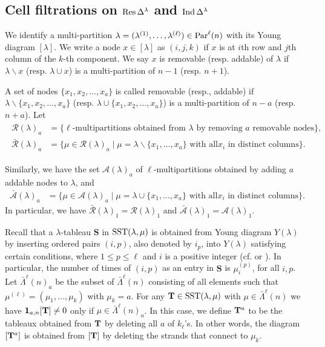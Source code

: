 \subsection{Cell filtrations on $\operatorname{Res}\nolimits \Delta^\lambda$ and $\operatorname{Ind}\nolimits \Delta^\lambda$}

We identify a multi-partition $\lambda=(\lambda^{(1)}, \ldots, \lambda^{(\ell)})\in \text{Par}^\ell(n)$ with its Young diagram $[\lambda]$. We write a node $x\in [\lambda]$ as $ (i,j,k)$ if $x$ is at $i$th row and $j$th column of the $k$-th component. We say $x$ is  removable (resp. addable) of $\lambda$ if $\lambda\backslash x$ (resp. $\lambda\cup x$) is a multi-partition of $n-1$ (resp. $n+1$). 

A set of nodes $\{x_1,x_2,\ldots,x_a\}$ is called removable (resp., addable) if $\lambda\backslash \{x_1,x_2,\ldots,x_a\}$ (resp. $\lambda\cup \{x_1,x_2,\ldots,x_a\}$) is a multi-partition of $n-a$ (resp. $n+a$). Let
\begin{align}
\begin{split}
    \mathcal R(\lambda)_a &=\{ \text{$\ell$-multipartitions  obtained from $\lambda$ by removing $a$ removable nodes}\},
    \\
    \bar {\mathcal R}(\lambda)_a &=\{\mu \in \mathcal R(\lambda)_a\mid \mu =\lambda\backslash \{x_1, \ldots,x_a\} \text{ with all
$x_i$ in distinct columns}\}.
\end{split}
\end{align}

Similarly, we have the set $\mathcal A(\lambda)_a$ of $\ell$-multipartitions obtained by adding $a$ addable nodes to $\lambda$, and 
\begin{align}
    \bar {\mathcal A}(\lambda)_a &=\{\mu \in \mathcal A(\lambda)_a\mid \mu =\lambda\cup \{x_1, \ldots,x_a\} \text{ with all
$x_i$ in distinct columns}\}.
\end{align}
In particular, we have $\bar {\mathcal R}(\lambda)_1=  \mathcal R(\lambda)_1$
and $\bar {\mathcal A}(\lambda)_1=  \mathcal A(\lambda)_1$.

Recall that a   $\lambda$-tableau $\mathbf S$ in $\text{SST}(\lambda, \mu)$ is obtained from Young diagram $Y(\lambda)$ by inserting ordered pairs $(i,p)$, also denoted by $i_p$, into $Y(\lambda)$ satisfying certain conditions,  where $1\le p\le \ell$ and $i$ is a positive integer (cf. \cite[Definition (4.4)]{DJM98} or \cite[Ex. 4.2]{SW24Schur}). In particular, the number of times of $(i,p)$ as an entry in $\mathbf S$ is $\mu^{(p)}_i$, for all $i,p$. Let $\bar \Lambda^\ell(n)_a$ be the subset of $\bar\Lambda^\ell(n)$ consisting of all  elements such that  $\mu^{(\ell)}=(\mu_1,\ldots,\mu_k)$ with  $\mu_k=a$.
For any $\mathbf{T}\in \text{SST}(\lambda, \mu)$ with $\mu\in \bar\Lambda^{\ell}(n)$ 
we have $\textbf{1}_{a,n}[\mathbf{T}]\neq 0$ only if $\mu\in \bar \Lambda^\ell(n)_a$.
In this case, we define $\mathbf{T}^a$ to be the tableaux obtained from $\mathbf{T}$ by deleting all $a$ of $k_{\ell}$'s. In other words, the diagram $[\mathbf{T}^a]$ is obtained from $[\mathbf{T}]$ by deleting the strands that connect to $\mu_k$.  


